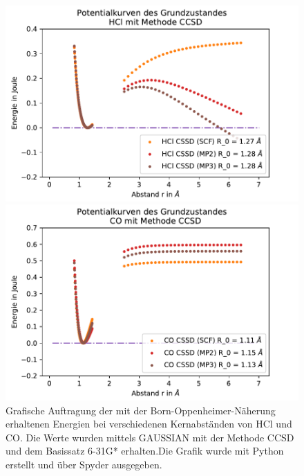  
\begin{figure}[H]
	
\begin{minipage}{0.5\textwidth}
	\includegraphics[width=\textwidth]{Bilder/HCl_CCSD}
\end{minipage}
\begin{minipage}{0.5\textwidth}
	\includegraphics[width=\textwidth]{Bilder/CO_CCSD}
\end{minipage}


\caption{Grafische Auftragung der mit der Born-Oppenheimer-Näherung erhaltenen Energien bei verschiedenen Kernabständen von HCl und CO. Die Werte wurden mittels GAUSSIAN mit der Methode CCSD und dem Basissatz 6-31G* erhalten.Die Grafik wurde mit Python erstellt und über Spyder ausgegeben.}


	\label{HCl_CCSD}
\end{figure}


